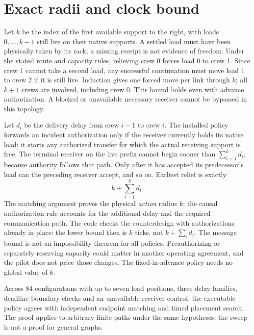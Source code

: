 \documentclass[11pt]{article}
\begin{document}
\section{Exact radii and clock bound}
Let \(k\) be the index of the first available support to the right, with loads \(0,\ldots,k-1\) still live on their native supports. A settled load must have been physically taken by its rack; a missing receipt is not evidence of freedom. Under the stated route and capacity rules, relieving crew 0 forces load 0 to crew 1. Since crew 1 cannot take a second load, any successful continuation must move load 1 to crew 2 if it is still live. Induction gives one forced move per link through \(k\); all \(k+1\) crews are involved, including crew 0. This bound holds even with advance authorization. A blocked or unavailable necessary receiver cannot be bypassed in this topology.

Let \(d_i\) be the delivery delay from crew \(i-1\) to crew \(i\). The installed policy forwards an incident authorization only if the receiver currently holds its native load; it starts any authorized transfer for which the actual receiving support is free. The terminal receiver on the live prefix cannot begin sooner than \(\sum_{i=1}^k d_i\), because authority follows that path. Only after it has accepted its predecessor's load can the preceding receiver accept, and so on. Earliest relief is exactly
\[
                 k+\sum_{i=1}^k d_i .
\]
The matching argument proves the physical \emph{action} radius \(k\); the causal authorization rule accounts for the additional delay and the required communication path. The code checks the counterdesign with authorizations already in place: the lower bound then is \(k\) ticks, not \(k+\sum_i d_i\). The message bound is not an impossibility theorem for all policies. Preauthorizing or separately reserving capacity could matter in another operating agreement, and the pilot does not price those changes. The fixed-in-advance policy needs no global value of \(k\).

Across 84 configurations with up to seven load positions, three delay families, deadline boundary checks and an unavailable-receiver control, the executable policy agrees with independent endpoint matching and timed placement search. The proof applies to arbitrary finite paths under the same hypotheses; the sweep is not a proof for general graphs.
\end{document}
